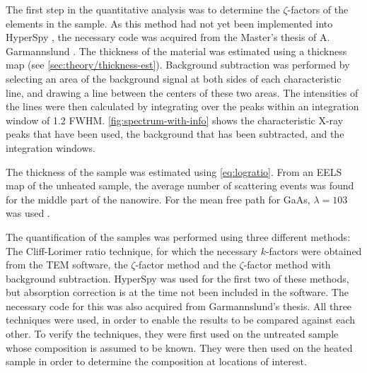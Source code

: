 The first step in the quantitative analysis was to determine the $\zeta$-factors of the elements in the sample. As this method had not yet been implemented into HyperSpy \cite{hyperspy}, the necessary code was acquired from the Master's thesis of A. Garmannslund \cite{andreas}. The thickness of the material was estimated using a thickness map (see \cref{sec:theory/thickness-est}). Background subtraction was performed by selecting an area of the background signal at both sides of each characteristic line, and drawing a line between the centers of these two areas. The intensities of the lines were then calculated by integrating over the peaks within an integration window of 1.2 FWHM. \cref{fig:spectrum-with-info} shows the characteristic X-ray peaks that have been used, the background that has been subtracted, and the integration windows.

The thickness of the sample was estimated using \cref{eq:logratio}. From an EELS map of the unheated sample, the average number of scattering events was found for the middle part of the nanowire. For the mean free path for GaAs, $\lambda=103$ was used \cite{andreas}.

The quantification of the samples was performed using three different methods: The Cliff-Lorimer ratio technique, for which the necessary $k$-factors were obtained from the TEM software, the $\zeta$-factor method and the $\zeta$-factor method with background subtraction. HyperSpy was used for the first two of these methods, but absorption correction is at the time not been included in the software. The necessary code for this was also acquired from Garmannslund's thesis. All three techniques were used, in order to enable the results to be compared against each other. To verify the techniques, they were first used on the untreated sample whose composition is assumed to be known. They were then used on the heated sample in order to determine the composition at locations of interest.